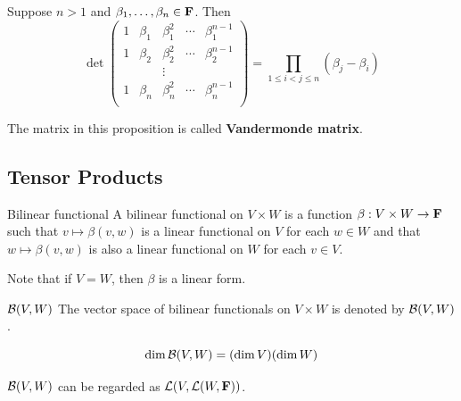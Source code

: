 \documentclass[12pt,a4paper]{article}
\begin{document}
    \begin{prop}
        Suppose $n>1$ and $\beta_1,\dots,\beta_n\in\mathbf{F}$. Then
        $$
        \det
        \begin{pmatrix}
            1 & \beta_1 & \beta_1^2 & \cdots & \beta_1^{n-1}\\[0.3em]
            1 & \beta_2 & \beta_2^2 & \cdots & \beta_2^{n-1}\\[0.3em]
              &         & \vdots    &        &              \\[0.3em]
            1 & \beta_n & \beta_n^2 & \cdots & \beta_n^{n-1}\\
        \end{pmatrix}
        =\prod_{1\leq i<j\leq n}(\beta_j-\beta_i)
        $$
    \end{prop}
    \begin{remark}
        The matrix in this proposition is called \textbf{Vandermonde matrix}.
    \end{remark}
    \hfill

    \subsection{Tensor Products}
    \begin{defi}{Bilinear functional}
        A bilinear functional on $V\times W$ is a function $\beta:V\times W\to \mathbf{F}$ such that $v\mapsto\beta(v,w)$ is a linear functional on $V$ for each $w\in W$ and that $w\mapsto\beta(v,w)$ is also a linear functional on $W$ for each $v\in V$.
    \end{defi}        
    \begin{remark}
        Note that if $V=W$, then $\beta$ is a linear form.
    \end{remark}
    \begin{notation}{$\mathcal{B}(V,W)$}
        The vector space of bilinear functionals on $V\times W$ is denoted by $\mathcal{B}(V,W)$.
    \end{notation}
    \hfill

    \begin{prop}
        $$
        \dim\mathcal{B}(V,W)=(\dim V)(\dim W)
        $$
    \end{prop}
    \begin{remark}
        $\mathcal{B}(V,W)$ can be regarded as $\mathcal{L}(V,\mathcal{L}(W,\mathbf{F}))$.
    \end{remark}
    \hfill
\end{document}
